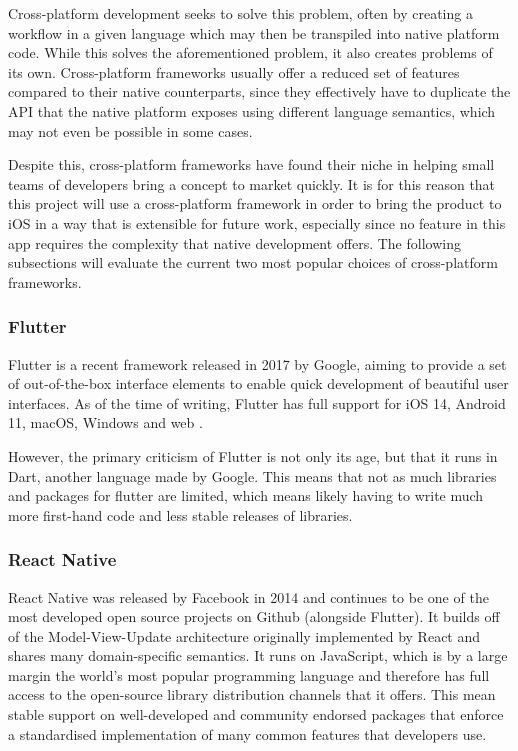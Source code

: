 Cross-platform development seeks to solve this problem, often by creating a workflow in a given language which may then be transpiled into native platform code. While this solves the aforementioned problem, it also creates problems of its own. Cross-platform frameworks usually offer a reduced set of features compared to their native counterparts, since they effectively have to duplicate the API that the native platform exposes using different language semantics, which may not even be possible in some cases.

Despite this, cross-platform frameworks have found their niche in helping small teams of developers bring a concept to market quickly. It is for this reason that this project will use a cross-platform framework in order to bring the product to iOS in a way that is extensible for future work, especially since no feature in this app requires the complexity that native development offers. The following subsections will evaluate the current two most popular choices of cross-platform frameworks.

\subsubsection{Flutter}
Flutter is a recent framework released in 2017 by Google, aiming to provide a set of out-of-the-box interface elements to enable quick development of beautiful user interfaces. As of the time of writing, Flutter has full support for iOS 14, Android 11, macOS, Windows and web \cite{fluttersupportedplatforms}.

However, the primary criticism of Flutter is not only its age, but that it runs in Dart, another language made by Google. This means that not as much libraries and packages for flutter are limited, which means likely having to write much more first-hand code and less stable releases of libraries.

\subsubsection{React Native}
React Native was released by Facebook in 2014 and continues to be one of the most developed open source projects on Github (alongside Flutter). It builds off of the Model-View-Update architecture originally implemented by React and shares many domain-specific semantics. It runs on JavaScript, which is by a large margin the world's most popular programming language \cite{sfdevsurvey} and therefore has full access to the open-source library distribution channels that it offers. This mean stable support on well-developed and community endorsed packages that enforce a standardised implementation of many common features that developers use.

